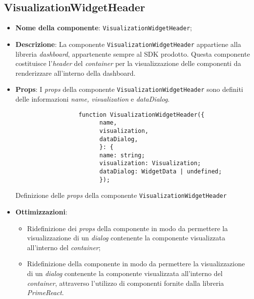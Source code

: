 \subsection{VisualizationWidgetHeader}
\begin{itemize}
      \item \textbf{Nome della componente}: \texttt{VisualizationWidgetHeader};
      \item \textbf{Descrizione}: La componente \texttt{VisualizationWidgetHeader} appartiene alla libreria \textit{dashboard}, appartenente sempre al SDK prodotto. Questa componente costituisce l'\textit{header}
            del \textit{container} per la visualizzazione delle componenti da renderizzare all'interno della dashboard. \newline
      \item \textbf{Props}: I \textit{props} della componente \texttt{VisualizationWidgetHeader} sono definiti delle informazioni \textit{name, visualization} e \textit{dataDialog}.
            \begin{listing}[H]
                  \begin{verbatim}
                  function VisualizationWidgetHeader({
                        name,
                        visualization,
                        dataDialog,
                        }: {
                        name: string;
                        visualization: Visualization;
                        dataDialog: WidgetData | undefined;
                        });
                  \end{verbatim}
                  \caption{Definizione delle \textit{props} della componente \texttt{VisualizationWidgetHeader}}
                  \label{listing:visualizationWidgetHeaderProps}
            \end{listing}
      \item \textbf{Ottimizzazioni}:
            \begin{itemize}
                  \item Ridefinizione dei \textit{props} della componente in modo da permettere la visualizzazione di un \textit{dialog} contenente la componente visualizzata all'interno del \textit{container};
                  \item Ridefinizione della componente in modo da permettere la visualizzazione di un \textit{dialog} contenente la componente visualizzata all'interno del \textit{container}, attraverso
                        l'utilizzo di componenti fornite dalla libreria \textit{PrimeReact}.
            \end{itemize}
\end{itemize}